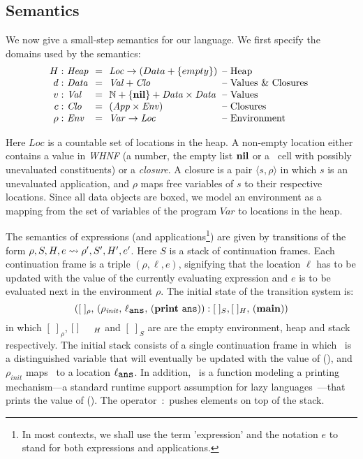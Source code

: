 \documentclass[9pt,nonatbib]{sigplanconf}
\newcommand{\stk}{{S}}
\begin{document}
\subsection{Semantics}\label{sec:semantics}
We now give  a small-step semantics for our  language.
We first specify the domains used by the semantics:
\[
\renewcommand{\arraystretch}{1}
\begin{array}{@{}r@{\ }l@{\ \ }c@{\ \ }l@{\hspace{0.5em}}l}
\heap: & \mathit{Heap} & =&\mathit{Loc} \rightarrow (Data + \{empty\}) & \mbox{-- Heap}\\
d: & \mathit{Data} &=&\mathit{Val} + \mathit{Clo} & \mbox{-- Values \& Closures} \\
v:   & \mathit{Val} &=& \mathbb{N} + \{\NIL\} + \mathit{Data \times Data}& \mbox{-- Values}\\
c:   & \mathit{Clo} &=& \mathit{(App \times Env)}& \mbox{-- Closures}\\
\rho: & \mathit{Env} &=&\mathit{Var} \rightarrow \mathit{Loc} &
\mbox{-- Environment} \\
\end{array}
\]


Here  $\mathit{Loc}$ is  a countable  set  of locations  in the  heap.
A non-empty location either contains  a value in  \emph{WHNF} (a  number, the
empty  list  $\mbox{$\mathbf{ nil}$}$ or  a  \CONS\  cell  with  possibly  unevaluated
constituents) or  a {\em closure}.   A closure  is a pair  $\langle s,
\rho\rangle$ in  which $s$ is  an unevaluated application,  and $\rho$
maps free variables of $s$ to their respective locations. Since all data objects are boxed, we model an environment as a mapping
from the set  of variables of the program  $\mathit{Var}$ to locations
in the  heap.  


The  semantics  of   expressions  (and  applications\footnote{In  most
 contexts, we  shall use the  term 'expression' and the  notation $e$
to stand   for both expressions and applications.}) 
are given by transitions of the form $\rho, \stk, \heap, e \rightsquigarrow
\rho',  \stk', \heap',  e'$.  Here  $\stk$ is  a stack  of continuation
frames.  Each  continuation frame  is a triple $(\rho,  \ell, e)$,
signifying that the  location $\ell$ has to be updated  with the value
of the  currently evaluating  expression and $e$  is to  be evaluated
next  in the  environment $\rho$.  
The  initial  state  of  the  transition  system  is:
\[([\;]_\rho,\,     (\rho_\mathit{init},     \,    \ell_{\mathbf{\mbox{\tt ans}}}     ,\,
(\mathbf{print}~\mathbf{\mbox{\tt ans}})):[\;]_{S},   [\;]_{H},\,   (\mathbf{main}))\]  in   which
$[\;]_\rho$, $[\;]_{\mbox  \footnotesize {H}}$ and $[\;]_{S}$  are are
the empty environment, heap and  stack respectively. The initial stack
consists  of  a  single  continuation   frame  in  which  \ans\  is  a
distinguished variable that will eventually  be updated with the value
of  (\mainpgm),  and  $\rho_\mathit{init}$  maps \ans\  to  a  location
$\ell_{\mathbf{\mbox{\tt ans}}}$.  In addition, \print\ is a function modeling a printing
mechanism---a   standard   runtime   support  assumption   for   lazy
languages~\cite{Jones87}---that prints  the value of  (\mainpgm).  The
operator~$:$ pushes elements on top of the stack.
\end{document}
